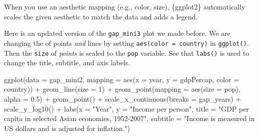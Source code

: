 \documentclass[
  letterpaper,
  DIV=11,
  numbers=noendperiod]{scrreprt}
\newenvironment{Shaded}{\begin{snugshade}}{\end{snugshade}}
\newcommand{\AttributeTok}[1]{\textcolor[rgb]{0.40,0.45,0.13}{#1}}
\newcommand{\DecValTok}[1]{\textcolor[rgb]{0.68,0.00,0.00}{#1}}
\newcommand{\FloatTok}[1]{\textcolor[rgb]{0.68,0.00,0.00}{#1}}
\newcommand{\FunctionTok}[1]{\textcolor[rgb]{0.28,0.35,0.67}{#1}}
\newcommand{\NormalTok}[1]{\textcolor[rgb]{0.00,0.23,0.31}{#1}}
\newcommand{\SpecialCharTok}[1]{\textcolor[rgb]{0.37,0.37,0.37}{#1}}
\newcommand{\StringTok}[1]{\textcolor[rgb]{0.13,0.47,0.30}{#1}}
\begin{document}
\begin{tcolorbox}[enhanced jigsaw, title=\textcolor{quarto-callout-note-color}{\faInfo}\hspace{0.5em}{Challenge}, colbacktitle=quarto-callout-note-color!10!white, leftrule=.75mm, arc=.35mm, opacityback=0, bottomrule=.15mm, rightrule=.15mm, toptitle=1mm, breakable, toprule=.15mm, colback=white, coltitle=black, colframe=quarto-callout-note-color-frame, bottomtitle=1mm, titlerule=0mm, left=2mm, opacitybacktitle=0.6]

When you use an aesthetic mapping (e.g., color, size), \{ggplot2\}
automatically scales the given aesthetic to match the data and adds a
legend.

Here is an updated version of the \texttt{gap\_mini3} plot we made
before. We are changing the of points \emph{and} lines by setting
\texttt{aes(color\ =\ country)} in \texttt{ggplot()}. Then the
\texttt{size} of \emph{points} is scaled to the \texttt{pop} variable.
See that \texttt{labs()} is used to change the title, subtitle, and axis
labels.

\begin{Shaded}
\begin{Highlighting}[]
\FunctionTok{ggplot}\NormalTok{(}\AttributeTok{data =}\NormalTok{ gap\_mini2, }
       \AttributeTok{mapping =} \FunctionTok{aes}\NormalTok{(}\AttributeTok{x =}\NormalTok{ year, }
                     \AttributeTok{y =}\NormalTok{ gdpPercap, }
                     \AttributeTok{color =}\NormalTok{ country)) }\SpecialCharTok{+}
  \FunctionTok{geom\_line}\NormalTok{(}\AttributeTok{size =} \DecValTok{1}\NormalTok{) }\SpecialCharTok{+}
  \FunctionTok{geom\_point}\NormalTok{(}\AttributeTok{mapping =} \FunctionTok{aes}\NormalTok{(}\AttributeTok{size =}\NormalTok{ pop),}
                           \AttributeTok{alpha =} \FloatTok{0.5}\NormalTok{) }\SpecialCharTok{+}
  \FunctionTok{geom\_point}\NormalTok{() }\SpecialCharTok{+}
  \FunctionTok{scale\_x\_continuous}\NormalTok{(}\AttributeTok{breaks =}\NormalTok{ gap\_years) }\SpecialCharTok{+}
  \FunctionTok{scale\_y\_log10}\NormalTok{()  }\SpecialCharTok{+}
  \FunctionTok{labs}\NormalTok{(}\AttributeTok{x =} \StringTok{"Year"}\NormalTok{, }
       \AttributeTok{y =} \StringTok{"Income per person"}\NormalTok{,}
       \AttributeTok{title =} \StringTok{"GDP per capita in selected Asian economies, 1952{-}2007"}\NormalTok{,}
       \AttributeTok{subtitle =} \StringTok{"Income is measured in US dollars and is adjusted for inflation."}\NormalTok{)}
\end{Highlighting}
\end{Shaded}


\end{tcolorbox}
\end{document}
